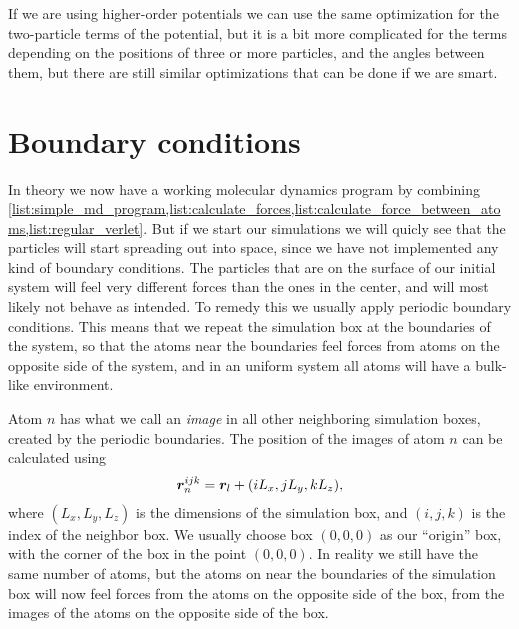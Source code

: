 If we are using higher-order potentials we can use the same optimization for the two-particle terms of the potential, but it is a bit more complicated for the terms depending on the positions of three or more particles, and the angles between them, but there are still similar optimizations that can be done if we are smart.




\section{Boundary conditions}
In theory we now have a working molecular dynamics program by combining \cref{list:simple_md_program,list:calculate_forces,list:calculate_force_between_atoms,list:regular_verlet}. But if we start our simulations we will quicly see that the particles will start spreading out into space, since we have not implemented any kind of boundary conditions. The particles that are on the surface of our initial system will feel very different forces than the ones in the center, and will most likely not behave as intended. To remedy this we usually apply periodic boundary conditions. This means that we repeat the simulation box at the boundaries of the system, so that the atoms near the boundaries feel forces from atoms on the opposite side of the system, and in an uniform system all atoms will have a bulk-like environment. 

Atom $n$ has what we call an \emph{image} in all other neighboring simulation boxes, created by the periodic boundaries. The position of the images of atom $n$ can be calculated using
\begin{align}
    \boldsymbol{r}_n^{ijk} = \boldsymbol{r}_l + (iL_x, jL_y, kL_z),
    \label{eq:pbc_positions}
\end{align}
where $(L_x, L_y, L_z)$ is the dimensions of the simulation box, and $(i, j, k)$ is the index of the neighbor box. We usually choose box $(0,0,0)$ as our ``origin'' box, with the corner of the box in the point $(0,0,0)$. In reality we still have the same number of atoms, but the atoms on near the boundaries of the simulation box will now feel forces from the atoms on the opposite side of the box, from the images of the atoms on the opposite side of the box.

